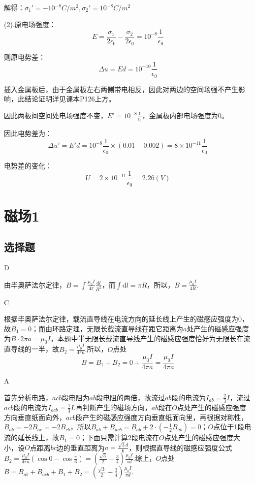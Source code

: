 \documentclass[b5paper,opensource,sourcefont,parskip]{qyxf-book}
\newcommand{\di}[1]{\mathrm{d}#1}
\begin{document}
解得：$\sigma_1'=-10^{-8}C/m^2,\sigma_2'=10^{-8}C/m^2$

(2).原电场强度：
\[E=\frac{\sigma_1}{2\epsilon_0}-\frac{\sigma_2}{2\epsilon_0}=10^{-8}\frac{1}{\epsilon_0}\]

则原电势差：
\[\Delta u=Ed=10^{-10}\frac{1}{\epsilon_0}\]

插入金属板后，由于金属板左右两侧带电相反，因此对两边的空间场强不产生影响，此结论证明详见课本P126上方。

因此两板间空间处电场强度不变，$ E'=10^{-8}\frac{1}{\epsilon_0} $，金属板内部电场强度为$ 0 $。

因此电势差为：
\[\Delta u'=E'd=10^{-8}\frac{1}{\epsilon_0}\times(0.01-0.002)=8\times 10^{-11}\frac{1}{\epsilon_0}\]

电势差的变化：
\[U=2\times10^{-11}\frac{1}{\epsilon_0}=2.26(V)\]

\chapter{磁场1}  %
\section{选择题}  %

D  %

\solve
由毕奥萨法尔定律，$B=\int\frac{\mu_0I}{4\pi}\frac{\di l}{R^2}$，而$\int\di l=\pi R$，所以，$B=\frac{\mu_0I}{4R}$.

C

\solve
根据毕奥萨法尔定律，载流直导线在电流方向的延长线上产生的磁感应强度为0，故$B_1=0$；而由环路定理，无限长载流直导线在距它距离为$a$处产生的磁感应强度为$B\cdot2\pi a=\mu_0I$，本题中半无限长载流直导线产生的磁感应强度恰好为无限长在流直导线的一半，故$B_2=\frac{\mu_0I}{4\pi a}$.所以，$O$点处
\begin{equation*}
B=B_1+B_2=0+\frac{\mu_0I}{4\pi a}=\frac{\mu_0I}{4\pi a}
\end{equation*}

A

\solve
首先分析电路，$acb$段电阻为$ab$段电阻的两倍，故流过$ab$段的电流为$I_{ab}=\frac{2}{3}I$，流过$acb$段的电流为$I_{acb}=\frac{1}{3}I$.再判断产生的磁场方向，$ab$段在$O$点处产生的磁感应强度方向垂直纸面向外，$acb$段产生的磁感应强度方向垂直纸面向里，再根据对称性，$B_{ab}=-2B_{ac}=-2B_{cb}$，所以$B_{ab}+B_{acb}=B_{ab}+2\cdot(-\frac{1}{2}B_{ab})=0$；$O$点位于1段电流的延长线上，故$B_1=0$；下面只需计算2段电流在$O$点处产生的磁感应强度大小，设$O$点距离$bc$边的垂直距离为$a=\frac{\sqrt{3}d}{6}$，则根据直导线的磁感应强度公式$B_2=\frac{\mu_0I}{4\pi a}(\cos 0-\cos\frac{\pi}{6})=(\frac{\sqrt{3}}{2}-\frac{3}{4})\frac{\mu_0I}{\pi d}$.综上，$O$点处$B=B_{ab}+B_{acb}+B_1+B_2=(\frac{\sqrt{3}}{2}-\frac{3}{4})\frac{\mu_0I}{\pi d}$.
\end{document}
